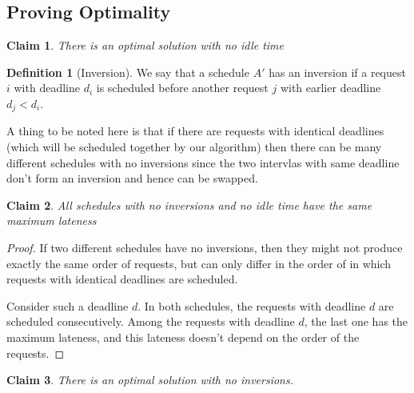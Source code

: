 \documentclass{article}
\newtheorem{claim}{Claim}
\theoremstyle{definition}
\newtheorem{definition}{Definition}
\begin{document}
\subsection{Proving Optimality}

\begin{claim}
There is an optimal solution with no idle time
\end{claim}

\begin{definition}[Inversion]
We say that a schedule $A'$ has an inversion if a request $i$ with 
deadline $d_i$ is scheduled before another request $j$ with earlier deadline
$d_j < d_i$.
\end{definition}

A thing to be noted here is that if there are requests with identical
deadlines (which will be scheduled together by our algorithm) then
there can be many different schedules with no inversions since the two
intervlas with same deadline don't form an inversion and hence can be
swapped.

\begin{claim}
All schedules with no inversions and no idle time have the same maximum
lateness
\end{claim}

\begin{proof}
If two different schedules have no inversions, then they might not 
produce exactly the same order of requests, but can only differ in the
order of in which requests with identical deadlines are scheduled.

Consider such a deadline $d$. In both schedules, the requests with
deadline $d$ are scheduled consecutively. Among the requests with
deadline $d$, the last one has the maximum lateness, and this lateness
doesn't depend on the order of the requests.
\end{proof}

\begin{claim}
There is an optimal solution with no inversions.
\end{claim}
\end{document}
